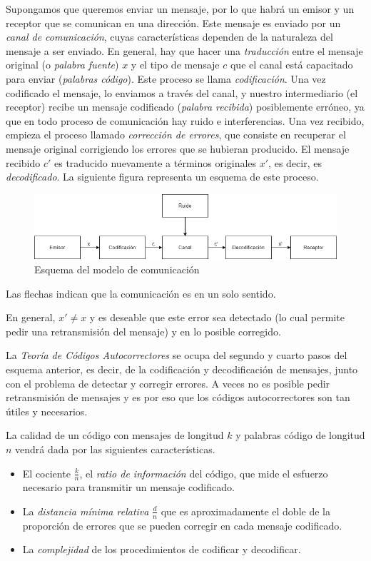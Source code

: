 Supongamos que queremos enviar un mensaje, por lo que habrá un emisor y un receptor que se comunican en una dirección. Este mensaje es enviado por un \emph{canal de comunicación}, cuyas características dependen de la naturaleza del mensaje a ser enviado. En general, hay que hacer una \emph{traducción} entre el mensaje original (o \emph{palabra fuente}) $x$ y el tipo de mensaje $c$ que el canal está capacitado para enviar (\emph{palabras código}). Este proceso se llama \emph{codificación}. Una vez codificado el mensaje, lo enviamos a través del canal, y nuestro intermediario (el receptor) recibe un mensaje codificado (\emph{palabra recibida}) posiblemente erróneo, ya que en todo proceso de comunicación hay ruido e interferencias. Una vez recibido, empieza el proceso llamado \emph{corrección de errores}, que consiste en recuperar el mensaje original corrigiendo los errores que se hubieran producido. El mensaje recibido $c'$ es traducido nuevamente a términos originales $x'$, es decir, es \emph{decodificado}. La siguiente figura representa un esquema de este proceso.

\begin{figure}[H]
	\center
	\includegraphics[scale=0.5]{figures/Diagrama_comunicacion.png}
	\caption{Esquema del modelo de comunicación}
\end{figure}

Las flechas indican que la comunicación es en un solo sentido.

En general, $x' \neq x$ y es deseable que este error sea detectado (lo cual permite pedir una retransmisión del mensaje) y en lo posible corregido.

La \emph{Teoría de Códigos Autocorrectores} se ocupa del segundo y cuarto pasos del esquema anterior, es decir, de la codificación y decodificación de mensajes, junto con el problema de detectar y corregir errores. A veces no es posible pedir retransmisión de mensajes y es por eso que los códigos autocorrectores son tan útiles y necesarios.

La calidad de un código con mensajes de longitud $k$ y palabras código de longitud $n$ vendrá dada por las siguientes características.

\begin{itemize}
    \item El cociente $\frac{k}{n}$, el \emph{ratio de información} del código, que mide el esfuerzo necesario para transmitir un mensaje codificado.
    \item La \emph{distancia mínima relativa} $\frac{d}{n}$ que es aproximadamente el doble de la proporción de errores que se pueden corregir en cada mensaje codificado.
    \item La \emph{complejidad} de los procedimientos de codificar y decodificar.
\end{itemize}

